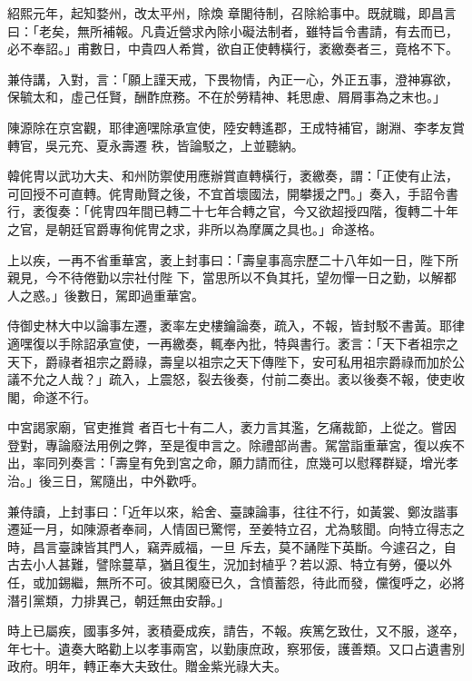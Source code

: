 \begin{pinyinscope}
 紹熙元年，起知婺州，改太平州，除煥
 章閣待制，召除給事中。既就職，即昌言曰：「老矣，無所補報。凡貴近營求內除小礙法制者，雖特旨令書請，有去而已，必不奉詔。」甫數日，中貴四人希賞，欲自正使轉橫行，袤繳奏者三，竟格不下。



 兼侍講，入對，言：「願上謹天戒，下畏物情，內正一心，外正五事，澄神寡欲，保毓太和，虛己任賢，酬酢庶務。不在於勞精神、耗思慮、屑屑事為之末也。」



 陳源除在京宮觀，耶律適嘿除承宣使，陸安轉遙郡，王成特補官，謝淵、李孝友賞轉官，吳元充、夏永壽遷
 秩，皆論駁之，上並聽納。



 韓侂冑以武功大夫、和州防禦使用應辦賞直轉橫行，袤繳奏，謂：「正使有止法，可回授不可直轉。侂冑勛賢之後，不宜首壞國法，開攀援之門。」奏入，手詔令書行，袤復奏：「侂冑四年間已轉二十七年合轉之官，今又欲超授四階，復轉二十年之官，是朝廷官爵專徇侂冑之求，非所以為摩厲之具也。」命遂格。



 上以疾，一再不省重華宮，袤上封事曰：「壽皇事高宗歷二十八年如一日，陛下所親見，今不待倦勤以宗社付陛
 下，當思所以不負其托，望勿憚一日之勤，以解都人之惑。」後數日，駕即過重華宮。



 侍御史林大中以論事左遷，袤率左史樓鑰論奏，疏入，不報，皆封駁不書黃。耶律適嘿復以手除詔承宣使，一再繳奏，輒奉內批，特與書行。袤言：「天下者祖宗之天下，爵祿者祖宗之爵祿，壽皇以祖宗之天下傳陛下，安可私用祖宗爵祿而加於公議不允之人哉？」疏入，上震怒，裂去後奏，付前二奏出。袤以後奏不報，使吏收閣，命遂不行。



 中宮謁家廟，官吏推賞
 者百七十有二人，袤力言其濫，乞痛裁節，上從之。嘗因登對，專論廢法用例之弊，至是復申言之。除禮部尚書。駕當詣重華宮，復以疾不出，率同列奏言：「壽皇有免到宮之命，願力請而往，庶幾可以慰釋群疑，增光孝治。」後三日，駕隨出，中外歡呼。



 兼侍讀，上封事曰：「近年以來，給舍、臺諫論事，往往不行，如黃裳、鄭汝諧事遷延一月，如陳源者奉祠，人情固已驚愕，至姜特立召，尤為駭聞。向特立得志之時，昌言臺諫皆其門人，竊弄威福，一旦
 斥去，莫不誦陛下英斷。今遽召之，自古去小人甚難，譬除蔓草，猶且復生，況加封植乎？若以源、特立有勞，優以外任，或加錫繼，無所不可。彼其閑廢已久，含憤蓄怨，待此而發，儻復呼之，必將潛引黨類，力排異己，朝廷無由安靜。」



 時上已屬疾，國事多舛，袤積憂成疾，請告，不報。疾篤乞致仕，又不服，遂卒，年七十。遺奏大略勸上以孝事兩宮，以勤康庶政，察邪佞，護善類。又口占遺書別政府。明年，轉正奉大夫致仕。贈金紫光祿大夫。




\end{pinyinscope}
